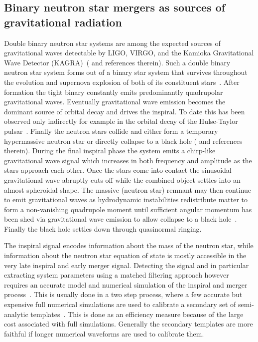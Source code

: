 \documentclass[12pt]{article}
\newcommand{\ligo}{LIGO}
\newcommand{\virgo}{VIRGO}
\newcommand{\kagra}{KAGRA}
\begin{document}
\subsection{Binary neutron star mergers as sources of gravitational radiation}
Double binary neutron star systems are among the expected sources of
gravitational waves detectable by
\ligo{}, \virgo{}, and the Kamioka Gravitational Wave Detector
(\kagra{})~(\cite{Anderson:2007km} and references therein).
Such a double binary neutron star system forms out of a binary
star system that
survives throughout the evolution and supernova explosion of both of its
constituent stars~\cite{Tauris:2003pf}. After formation the tight binary
constantly emits predominantly quadrupolar gravitational waves. Eventually
gravitational wave emission becomes the
dominant source of orbital decay and drives the inspiral. To date this has been
observed only indirectly for example 
in the orbital decay of the Hulse-Taylor pulsar~\cite{Hulse:1975}. 
Finally the neutron stars collide and either form
a temporary hypermassive neutron star or directly collapse to a black
hole (\cite{Faber:2012rw} and references therein). During the final inspiral
phase the system emits a
chirp-like gravitational wave signal which increases in both frequency and
amplitude as the stars approach each other. Once the stars come into
contact the sinusoidal gravitational wave abruptly cuts off 
while the combined object settles into an almost
spheroidal
shape. The massive (neutron star) remnant may then continue to emit
gravitational waves as hydrodynamic instabilities redistribute matter to form a
non-vanishing quadrupole moment until sufficient angular momentum has been
shed via gravitational wave emission to allow collapse to a black 
hole~\cite{Giacomazzo:2011cv}.  Finally the
black hole settles down through quasinormal ringing. 

The inspiral signal encodes information about the mass of the neutron star,
while information about the neutron star equation of state is mostly
accessible in the
very late
inspiral and early merger signal. Detecting the signal and in particular
extracting
system parameters using a matched filtering approach however requires an
accurate model and numerical simulation of the inspiral and merger
process~\cite{Anderson:2007km}. This is usually done in a two step process,
where a few accurate but expensive full numerical simulations are used to
calibrate a secondary set of semi-analytic templates~\cite{Bernuzzi:2012ci}.
This is done as an
efficiency measure because of the large cost associated with full
simulations. Generally the secondary templates are more faithful if longer
numerical waveforms are used to calibrate them. 
\end{document}
